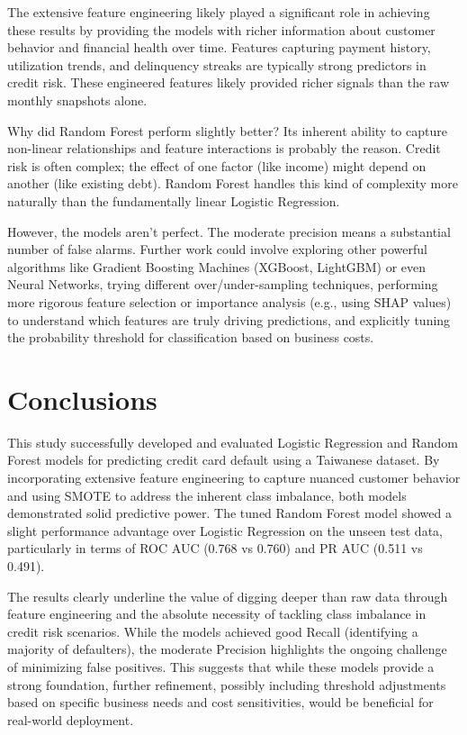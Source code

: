\documentclass[a4paper,12pt]{article}
\begin{document}
The extensive feature engineering likely played a significant role in achieving these results by providing the models with richer information about customer behavior and financial health over time. Features capturing payment history, utilization trends, and delinquency streaks are typically strong predictors in credit risk. These engineered features likely provided richer signals than the raw monthly snapshots alone.

Why did Random Forest perform slightly better? Its inherent ability to capture non-linear relationships and feature interactions is probably the reason. Credit risk is often complex; the effect of one factor (like income) might depend on another (like existing debt). Random Forest handles this kind of complexity more naturally than the fundamentally linear Logistic Regression.

However, the models aren't perfect. The moderate precision means a substantial number of false alarms. Further work could involve exploring other powerful algorithms like Gradient Boosting Machines (XGBoost, LightGBM) or even Neural Networks, trying different over/under-sampling techniques, performing more rigorous feature selection or importance analysis (e.g., using SHAP values) to understand which features are truly driving predictions, and explicitly tuning the probability threshold for classification based on business costs.

\section{Conclusions}

This study successfully developed and evaluated Logistic Regression and Random Forest models for predicting credit card default using a Taiwanese dataset. By incorporating extensive feature engineering to capture nuanced customer behavior and using SMOTE to address the inherent class imbalance, both models demonstrated solid predictive power. The tuned Random Forest model showed a slight performance advantage over Logistic Regression on the unseen test data, particularly in terms of ROC AUC (0.768 vs 0.760) and PR AUC (0.511 vs 0.491).

The results clearly underline the value of digging deeper than raw data through feature engineering and the absolute necessity of tackling class imbalance in credit risk scenarios. While the models achieved good Recall (identifying a majority of defaulters), the moderate Precision highlights the ongoing challenge of minimizing false positives. This suggests that while these models provide a strong foundation, further refinement, possibly including threshold adjustments based on specific business needs and cost sensitivities, would be beneficial for real-world deployment.
\end{document}
